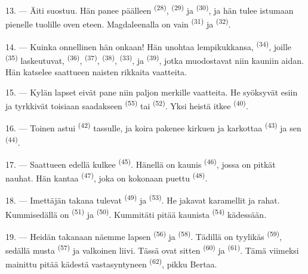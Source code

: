13. --- Äiti suostuu. Hän panee päälleen 
\textsuperscript{(28)},  \textsuperscript{(29)} ja
 \textsuperscript{(30)}, ja hän tulee istumaan pienelle
tuolille oven eteen. Magdaleenalla on vain 
\textsuperscript{(31)} ja  \textsuperscript{(32)}.

14. --- Kuinka onnellinen hän onkaan! Hän unohtaa lempikukkansa,
 \textsuperscript{(34)}, joille 
\textsuperscript{(35)} laskeutuvat, 
\textsuperscript{(36)},  \textsuperscript{(37)},
 \textsuperscript{(38)}, 
\textsuperscript{(33)}, ja  \textsuperscript{(39)}, jotka
muodostavat niin kauniin aidan. Hän katselee saattueen naisten rikkaita
vaatteita.

15. --- Kylän lapset eivät pane niin paljon merkille vaatteita. He syöksyvät
esiin ja tyrkkivät toisiaan saadakseen 
\textsuperscript{(55)} tai  \textsuperscript{(52)}. Yksi heistä
itkee \textsuperscript{(40)}.

16. --- Toinen astui  \textsuperscript{(42)} tassulle, ja koira
pakenee kirkuen ja karkottaa  \textsuperscript{(43)} ja sen
 \textsuperscript{(44)}.

\VUsaut{5.0mm}
\VUsaut{4.0mm}

17. --- Saattueen edellä kulkee  \textsuperscript{(45)}.
Hänellä on kaunis  \textsuperscript{(46)}, jossa on pitkät nauhat.
Hän kantaa  \textsuperscript{(47)}, joka on kokonaan
puettu  \textsuperscript{(48)}.

18. --- Imettäjän takana tulevat  \textsuperscript{(49)} ja
 \textsuperscript{(53)}. He jakavat karamellit ja rahat.
Kummisedällä on  \textsuperscript{(51)} ja
 \textsuperscript{(50)}. Kummitäti pitää kaunista
 \textsuperscript{(54)} kädessään.

19. --- Heidän takanaan näemme lapsen  \textsuperscript{(56)} ja
 \textsuperscript{(58)}. Tädillä on tyylikäs 
\textsuperscript{(59)}, sedällä musta  \textsuperscript{(57)} ja
valkoinen liivi. Tässä ovat sitten  \textsuperscript{(60)} ja
 \textsuperscript{(61)}. Tämä viimeksi mainittu pitää kädestä
vastasyntyneen  \textsuperscript{(62)}, pikku Bertaa.

